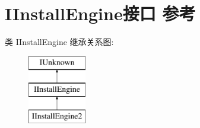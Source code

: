 \hypertarget{interface_i_install_engine}{}\section{I\+Install\+Engine接口 参考}
\label{interface_i_install_engine}
类 I\+Install\+Engine 继承关系图\+:\begin{figure}[H]
\begin{center}
\leavevmode
\includegraphics[height=3.000000cm]{interface_i_install_engine}
\end{center}
\end{figure}
